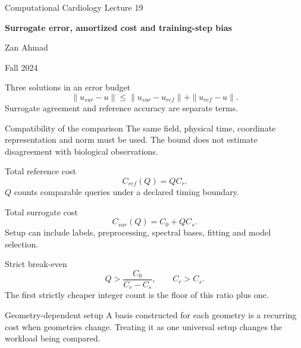 \documentclass[aspectratio=169,11pt]{beamer}
\newcommand{\notestarget}{notes.pdf}\newcommand{\noteslabel}{Notes}
\begin{document}
\begin{frame}[plain]\vfill
{\small\color{accent} Computational Cardiology \quad Lecture 19}\par\medskip
{\raggedright{}\LARGE\bfseries\color{ink} Surrogate error, amortized cost and training-step bias}\par\bigskip
Zan Ahmad\par\smallskip
{\small Fall 2024}\par\vfill\end{frame}
\renewcommand{\notestarget}{notes.pdf\#note-reference-error-and-approximation-error}
\begin{frame}[t,fragile,label=slide-three-solutions-in-an-error-budget]{Three solutions in an error budget}
\[\|u_{sur}-u\|\le\|u_{sur}-u_{ref}\|+\|u_{ref}-u\|.\]\pause{} Surrogate agreement and reference accuracy are separate terms.
\end{frame}
\renewcommand{\notestarget}{notes.pdf\#note-reference-error-and-approximation-error}
\begin{frame}[t,fragile,label=slide-compatibility-of-the-comparison]{Compatibility of the comparison}
The same field, physical time, coordinate representation and norm must be used.\pause{} The bound does not estimate disagreement with biological observations.
\end{frame}
\renewcommand{\notestarget}{notes.pdf\#note-amortized-computational-cost}
\begin{frame}[t,fragile,label=slide-total-reference-cost]{Total reference cost}
\[C_{ref}(Q)=QC_r.\]\pause{} $Q$ counts comparable queries under a declared timing boundary.
\end{frame}
\renewcommand{\notestarget}{notes.pdf\#note-amortized-computational-cost}
\begin{frame}[t,fragile,label=slide-total-surrogate-cost]{Total surrogate cost}
\[C_{sur}(Q)=C_0+QC_s.\]\pause{} Setup can include labels, preprocessing, spectral bases, fitting and model selection.
\end{frame}
\renewcommand{\notestarget}{notes.pdf\#note-amortized-computational-cost}
\begin{frame}[t,fragile,label=slide-strict-break-even]{Strict break-even}
\[Q>\frac{C_0}{C_r-C_s},\qquad C_r>C_s.\]\pause{} The first strictly cheaper integer count is the floor of this ratio plus one.
\end{frame}
\renewcommand{\notestarget}{notes.pdf\#note-amortized-computational-cost}
\begin{frame}[t,fragile,label=slide-geometry-dependent-setup]{Geometry-dependent setup}
A basis constructed for each geometry is a recurring cost when geometries change.\pause{} Treating it as one universal setup changes the workload being compared.
\end{frame}
\end{document}
